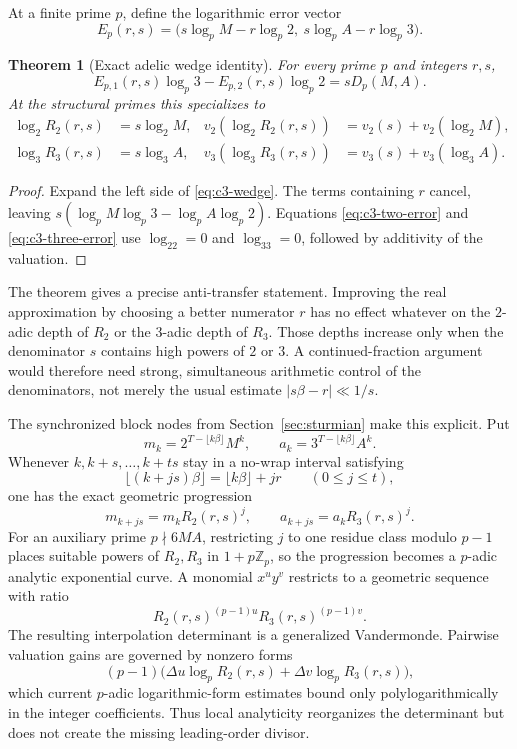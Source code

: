 \documentclass[11pt,oneside]{article}
\newtheorem{theorem}{Theorem}[section]
\theoremstyle{definition}
\theoremstyle{remark}
\newcommand{\Z}{\mathbb Z}
\begin{document}
At a finite prime $p$, define the logarithmic error vector
\begin{equation}\label{eq:c3-Ep}
 E_p(r,s)=
 \bigl(s\log_pM-r\log_p2,\ s\log_pA-r\log_p3\bigr).
\end{equation}

\begin{theorem}[Exact adelic wedge identity]
\label{thm:c3-wedge}
For every prime $p$ and integers $r,s$,
\begin{equation}\label{eq:c3-wedge}
 E_{p,1}(r,s)\log_p3-E_{p,2}(r,s)\log_p2
 =sD_p(M,A).
\end{equation}
At the structural primes this specializes to
\begin{align}
 \log_2R_2(r,s)&=s\log_2M,
 &v_2(\log_2R_2(r,s))&=v_2(s)+v_2(\log_2M),
 \label{eq:c3-two-error}\\
 \log_3R_3(r,s)&=s\log_3A,
 &v_3(\log_3R_3(r,s))&=v_3(s)+v_3(\log_3A).
 \label{eq:c3-three-error}
\end{align}
\end{theorem}

\begin{proof}
Expand the left side of \eqref{eq:c3-wedge}.  The terms containing $r$ cancel, leaving
$s(\log_pM\log_p3-\log_pA\log_p2)$.  Equations
\eqref{eq:c3-two-error} and \eqref{eq:c3-three-error} use $\log_22=0$ and $\log_33=0$,
followed by additivity of the valuation.
\end{proof}

The theorem gives a precise anti-transfer statement.  Improving the real approximation by
choosing a better numerator $r$ has no effect whatever on the $2$-adic depth of $R_2$ or the
$3$-adic depth of $R_3$.  Those depths increase only when the denominator $s$ contains high
powers of $2$ or $3$.  A continued-fraction argument would therefore need strong, simultaneous
arithmetic control of the denominators, not merely the usual estimate
$|s\beta-r|\ll1/s$.

The synchronized block nodes from Section~\ref{sec:sturmian} make this explicit.  Put
\[
 m_k=2^{T-\lfloor k\beta\rfloor}M^k,
 \qquad
 a_k=3^{T-\lfloor k\beta\rfloor}A^k.
\]
Whenever $k,k+s,\ldots,k+ts$ stay in a no-wrap interval satisfying
\[
 \lfloor(k+js)\beta\rfloor=\lfloor k\beta\rfloor+jr
 \qquad(0\le j\le t),
\]
one has the exact geometric progression
\begin{equation}\label{eq:c3-no-wrap}
 m_{k+js}=m_kR_2(r,s)^j,
 \qquad
 a_{k+js}=a_kR_3(r,s)^j.
\end{equation}
For an auxiliary prime $p\nmid6MA$, restricting $j$ to one residue class modulo $p-1$
places suitable powers of $R_2,R_3$ in $1+p\Z_p$, so the progression becomes a
$p$-adic analytic exponential curve.  A monomial $x^uy^v$ restricts to a geometric sequence
with ratio
\[
  R_2(r,s)^{(p-1)u}R_3(r,s)^{(p-1)v}.
\]
The resulting interpolation determinant is a generalized Vandermonde.  Pairwise valuation
gains are governed by nonzero forms
\[
 (p-1)\bigl(\Delta u\log_pR_2(r,s)+\Delta v\log_pR_3(r,s)\bigr),
\]
which current $p$-adic logarithmic-form estimates bound only polylogarithmically in the
integer coefficients.  Thus local analyticity reorganizes the determinant but does not create
the missing leading-order divisor.
\end{document}
